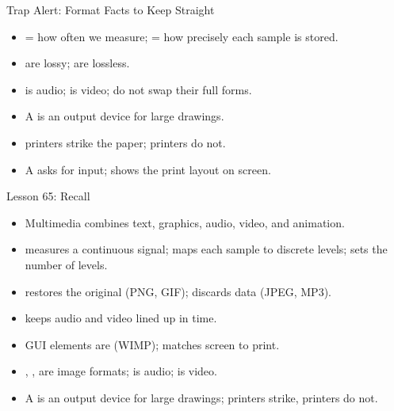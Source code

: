 \documentclass[aspectratio=169]{beamer}
\begin{document}
\begin{frame}{Trap Alert: Format Facts to Keep Straight}
  \begin{itemize}
    \item {} = how often we measure;  = how
      precisely each sample is stored.
    \item {} are lossy;  are lossless.
    \item {} is audio;  is video; do not swap their full forms.
    \item A  is an output device for large drawings.
    \item {} printers strike the paper;  printers do
      not.
    \item A  asks for input;  shows the print
      layout on screen.
  \end{itemize}
\end{frame}

\begin{frame}{Lesson 65: Recall}
  \begin{itemize}
    \item Multimedia combines text, graphics, audio, video, and animation.
    \item {} measures a continuous signal;  maps
      each sample to discrete levels;  sets the number of
      levels.
    \item {} restores the original (PNG, GIF);  discards
      data (JPEG, MP3).
    \item {} keeps audio and video lined up in time.
    \item GUI elements are  (WIMP);
       matches screen to print.
    \item {}, ,  are image formats;  is
      audio;  is video.
    \item A  is an output device for large drawings; 
      printers strike,  printers do not.
  \end{itemize}
\end{frame}
\end{document}
